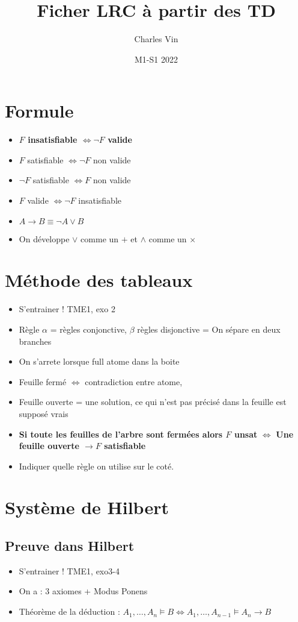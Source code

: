 \documentclass{article}
\title{Ficher LRC à partir des TD}
\author{Charles Vin}
\date{M1-S1 2022}
\theoremstyle{plain}%
\theoremstyle{definition}
\theoremstyle{remark}
\begin{document}
\maketitle

\section{Formule}
\begin{itemize}
    \item \textbf{$ F $ insatisfiable $ \Leftrightarrow \neg F$ valide}
    \item $ F $ satisfiable $ \Leftrightarrow \neg F$ non valide
    \item $ \neg F $ satisfiable $ \Leftrightarrow F$ non valide
    \item $ F $ valide $ \Leftrightarrow \neg F$ insatisfiable
    \item \textbf{$ A \to B \equiv \neg A \vee B $ }
    \item On développe $ \vee  $ comme un $ + $ et $ \wedge  $ comme un $ \times  $ 
\end{itemize}

\section{Méthode des tableaux}
\begin{itemize}
    \item S'entrainer ! TME1, exo 2
    \item Règle $ \alpha  $ = règles conjonctive, $ \beta  $ règles disjonctive = On sépare en deux branches
    \item On s'arrete lorsque full atome dans la boite
    \item Feuille fermé $ \Leftrightarrow $ contradiction entre atome, 
    \item Feuille ouverte = une solution, ce qui n'est pas précisé dans la feuille est supposé vrais
    \item \textbf{Si toute les feuilles de l'arbre sont fermées alors $ F $ unsat} $ \Leftrightarrow $ \textbf{Une feuille ouverte $\rightarrow F$ satisfiable}
    \item Indiquer quelle règle on utilise sur le coté.
\end{itemize}

\section{Système de Hilbert}
\subsection{Preuve dans Hilbert}
\begin{itemize}
    \item S'entrainer ! TME1, exo3-4
    \item On a : 3 axiomes + Modus Ponens
    \item Théorème de la déduction : $ A_1, \dots, A_n \models B \Leftrightarrow A_1, \dots, A_{n-1} \models A_n \to B$ 
\end{itemize}
\end{document}
